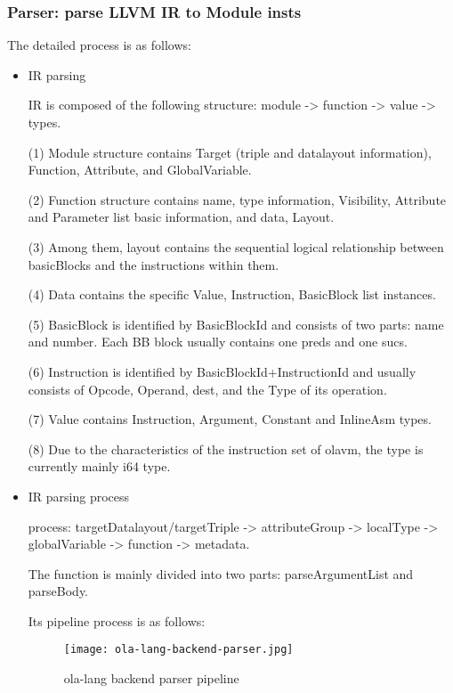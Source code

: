 \subsubsection{Parser: parse LLVM IR to Module insts}

The detailed process is as follows:
    \begin{itemize}
        \item IR parsing

IR is composed of the following structure: module -> function -> value -> types.

(1) Module structure contains Target (triple and datalayout information), Function, Attribute, and GlobalVariable.

(2) Function structure contains name, type information, Visibility, Attribute and Parameter list basic information, and data, Layout.

(3) Among them, layout contains the sequential logical relationship between basicBlocks and the instructions within them.

(4) Data contains the specific Value, Instruction, BasicBlock list instances.

(5) BasicBlock is identified by BasicBlockId and consists of two parts: name and number. Each BB block usually contains one preds and one sucs.

(6) Instruction is identified by BasicBlockId+InstructionId and usually consists of Opcode, Operand, dest, and the Type of its operation.

(7) Value contains Instruction, Argument, Constant and InlineAsm types.

(8) Due to the characteristics of the instruction set of olavm, the type is currently mainly i64 type.

        \item IR parsing process

process: targetDatalayout/targetTriple -> attributeGroup -> localType -> globalVariable -> function -> metadata.

The function is mainly divided into two parts: parseArgumentList and parseBody.

Its pipeline process is as follows:
\begin{figure}[!htbp]
    \centering
    \texttt{[image: ola-lang-backend-parser.jpg]}
    \caption{ola-lang backend parser pipeline}
    \label{fig:ola-lang-backend-parser}
\end{figure}
\end{itemize}